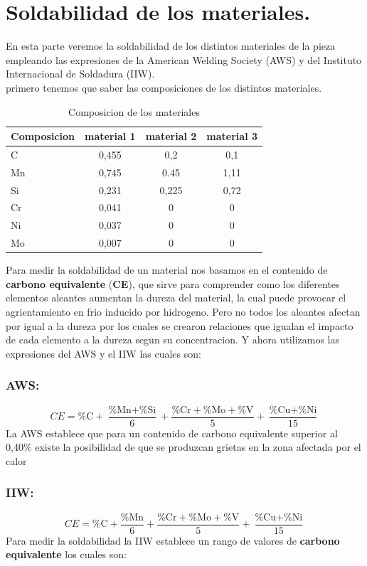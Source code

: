 \documentclass[12pt,a4paper]{article}
\begin{document}
\section{Soldabilidad de los materiales.}
En esta parte veremos la soldabilidad de los distintos materiales de la pieza empleando las expresiones de la American Welding Society
(AWS) y del Instituto Internacional de Soldadura (IIW).\\
primero tenemos que saber las composiciones de los distintos materiales.
\begin{table}[h]
    \centering
    \caption{Composicion de los materiales}
    \begin{tabular}{l|c|c|c}
        \hline
        Composicion & material 1 & material 2 & material 3\\
        \hline
        C & 0,455 & 0,2 & 0,1\\
        Mn & 0,745 & 0.45 & 1,11\\
        Si & 0,231 & 0,225 & 0,72\\
        Cr & 0,041 & 0 & 0\\
        Ni & 0,037 & 0 & 0\\
        Mo & 0,007 & 0 & 0\\
        \hline
    \end{tabular}
\end{table}
Para medir la soldabilidad de un material nos basamos en el contenido de \textbf{carbono equivalente} (\textbf{CE}), que sirve para comprender como los diferentes elementos aleantes aumentan la dureza del material, la cual puede provocar el agrientamiento en frio inducido por hidrogeno.
Pero no todos los aleantes afectan por igual a la dureza por los cuales se crearon relaciones que igualan el impacto de cada elemento a la dureza segun su concentracion.
Y ahora utilizamos las expresiones del AWS y el IIW las cuales son:\\
\subsubsection{AWS:}
\begin{equation*}
    CE = \text{\%C} + \frac{\text{\%Mn}+\text{\%Si}}{6} + \frac{\text{\%Cr}+\text{\%Mo}+\text{\%V}}{5} + \frac{\text{\%Cu}+\text{\%Ni}}{15}
\end{equation*}
La AWS establece que para un contenido de carbono equivalente superior al 0,40\% existe la posibilidad de que se produzcan grietas en la zona afectada por el calor 

\subsubsection{IIW:}
\begin{equation*}
    CE = \text{\%C} + \frac{\text{\%Mn}}{6} + \frac{\text{\%Cr}+\text{\%Mo}+\text{\%V}}{5} + \frac{\text{\%Cu}+\text{\%Ni}}{15}
\end{equation*}
Para medir la soldabilidad la IIW establece un rango de valores de \textbf{carbono equivalente} los cuales son:
\end{document}
